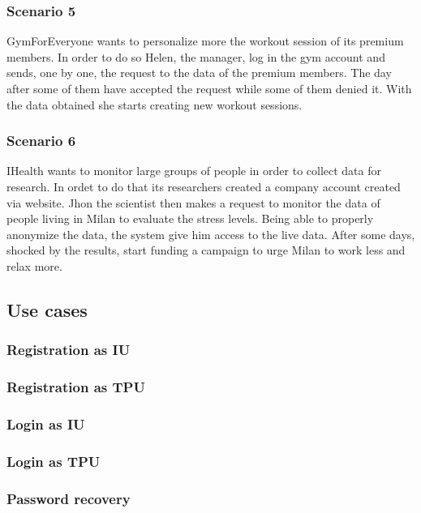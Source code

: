 \subsubsection{Scenario 5}
GymForEveryone wants to personalize more the workout session of its premium members. In order to do so Helen, the manager, log in the gym account and sends, one by one, the request to the data of the premium members. The day after some of them have accepted the request while some of them denied it. With the data obtained she starts creating new workout sessions.
\subsubsection{Scenario 6}
IHealth wants to monitor large groups of people in order to collect data for research. In ordet to do that its researchers created a company account created via website. Jhon the scientist then makes a request to monitor the data of people living in Milan to evaluate the stress levels. Being able to properly anonymize the data, the system give him access to the live data. After some days, shocked by the results, start funding a campaign to urge Milan to work less and relax more.
\clearpage
\subsection{Use cases}


\subsubsection{Registration as IU}

\clearpage
\subsubsection{Registration as TPU}

\clearpage
\subsubsection{Login as IU}

\clearpage
\subsubsection{Login as TPU}

\clearpage
\subsubsection{Password recovery}

\clearpage
